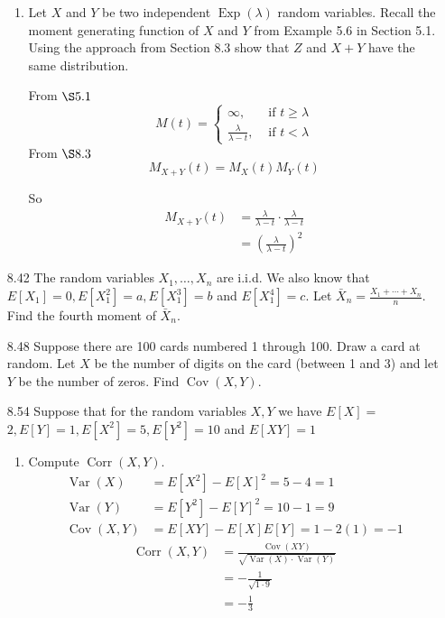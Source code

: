\documentclass[10pt]{article}
\begin{document}
\begin{itemize}
\begin{enumerate}
       \item Let $X$ and $Y$ be two independent $\operatorname{Exp}(\lambda)$ random variables. Recall the moment generating function of $X$ and $Y$ from Example 5.6 in Section 5.1. Using the approach from Section 8.3 show that $Z$ and $X+Y$ have the same distribution.

          From $\S 5.1$
          \[
         M(t)= \begin{cases}\infty, & \text { if } t \geq \lambda \\ \frac{\lambda}{\lambda-t}, & \text { if } t<\lambda\end{cases}
         \]
          From $\S 8.3$
          \[ M_{X+Y}(t)=M_X(t) M_Y(t) \]

          So
          \begin{align*}
             M_{X+Y}(t) &= \frac{\lambda}{\lambda-t} \cdot \frac{\lambda}{\lambda-t} \\
             &= \left( \frac{\lambda}{\lambda-t} \right)^2
          \end{align*}


     \end{enumerate}

\newpage
   \item[8.42] The random variables $X_{1}, \ldots, X_{n}$ are i.i.d. We also know that $E\left[X_{1}\right]=0, E\left[X_{1}^{2}\right]=a, E\left[X_{1}^{3}\right]=b$ and $E\left[X_{1}^{4}\right]=c$. Let $\bar{X}_{n}=\frac{X_{1}+\cdots+X_{n}}{n}$. Find the fourth moment of $\bar{X}_{n}$.

\newpage
   \item[8.48] Suppose there are 100 cards numbered 1 through 100. Draw a card at random. Let $X$ be the number of digits on the card (between 1 and 3) and let $Y$ be the number of zeros. Find $\operatorname{Cov}(X, Y)$.

\newpage
   \item[8.54] Suppose that for the random variables $X, Y$ we have $E[X]=$ $2, E[Y]=1, E\left[X^{2}\right]=5, E\left[Y^{2}\right]=10$ and $E[X Y]=1$

     \begin{enumerate}
       \item Compute $\operatorname{Corr}(X, Y)$.
          \begin{align*}
             \operatorname{Var}(X) &= E[X^2] - E[X]^2 = 5 - 4 = 1  \\
           \operatorname{Var}(Y) &= E[Y^2] - E[Y]^2 = 10 - 1 = 9  \\
           \operatorname{Cov}(X,Y) &= E[XY] - E[X]E[Y] = 1 - 2(1) = -1
          \end{align*}
          \begin{align*}
             \operatorname{Corr}(X,Y) &= \frac{\operatorname{Cov}(XY)}{\sqrt{\operatorname{Var}(X) \cdot \operatorname{Var}(Y)}} \\
                         &= -\frac{1}{\sqrt{1 \cdot 9}}  \\
                         &= -\frac{1}{3}
         \end{align*}


\end{enumerate}
\end{itemize}
\end{document}
